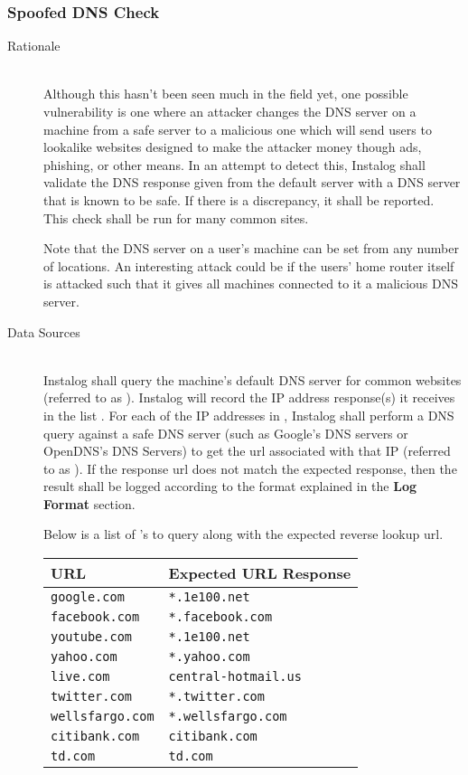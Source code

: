 \subsubsection{Spoofed DNS Check} \label{sec:hjt_dnscheck}
\begin{description}
\item[Rationale] \hfill \\
Although this hasn't been seen much in the field yet, one possible vulnerability
is one where an attacker changes the DNS server on a machine from a safe server
to a malicious one which will send users to lookalike websites designed to make
the attacker money though ads, phishing, or other means.  In an attempt to
detect this, Instalog shall validate the DNS response given from the default
server with a DNS server that is known to be safe.  If there is a discrepancy,
it shall be reported.  This check shall be run for many common sites.

Note that the DNS server on a user's machine can be set from any number of
locations.  An interesting attack could be if the users' home router itself is
attacked such that it gives all machines connected to it a malicious DNS server.
\item[Data Sources] \hfill \\
Instalog shall query the machine's default DNS server for common websites
(referred to as ).  Instalog will record the IP address response(s) it
receives in the list .  For each of the
 IP addresses in , Instalog shall perform a DNS
query against a safe DNS server (such as Google's DNS servers or OpenDNS's DNS
Servers) to get the url associated with that IP (referred to as ).
If the response url does not match the expected response, then the result shall be
logged according to the format explained in the \textbf{Log Format} section.

Below is a list of 's to query along with the expected reverse lookup
url.

\begin{tabular}{l | l}
\textbf{URL} & \textbf{Expected URL Response} \\ \hline 
\verb|google.com| & \verb|*.1e100.net| \\ \hline
\verb|facebook.com| & \verb|*.facebook.com| \\ \hline
\verb|youtube.com| & \verb|*.1e100.net| \\ \hline
\verb|yahoo.com| & \verb|*.yahoo.com| \\ \hline
\verb|live.com| & \verb|central-hotmail.us| \\ \hline
\verb|twitter.com| & \verb|*.twitter.com| \\ \hline
\verb|wellsfargo.com| & \verb|*.wellsfargo.com| \\ \hline
\verb|citibank.com| & \verb|citibank.com| \\ \hline
\verb|td.com| & \verb|td.com|
\end{tabular}


\end{description}
